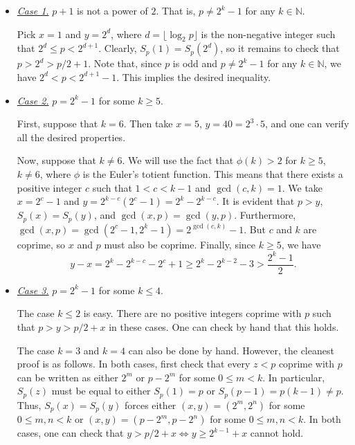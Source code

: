 \documentclass{article}
\newcommand{\N}{\mathbb{N}}
\begin{document}
\begin{itemize}

    \item
    \textit{\underline{Case 1.}}
    $p + 1$ is not a power of $2$.
    That is, $p \neq 2^k - 1$ for any $k \in \N$.

    Pick $x = 1$ and $y = 2^d$, where $d = \lfloor \log_2 p \rfloor$ is the non-negative integer such that $2^d \leq p < 2^{d + 1}$.
    Clearly, $S_p(1) = S_p(2^d)$, so it remains to check that $p > 2^d > p/2 + 1$.
    Note that, since $p$ is odd and $p \neq 2^k - 1$ for any $k \in \N$, we have $2^d < p < 2^{d + 1} - 1$.
    This implies the desired inequality.

    \item
    \textit{\underline{Case 2.}}
    $p = 2^k - 1$ for some $k \geq 5$.

    First, suppose that $k = 6$.
    Then take $x = 5$, $y = 40 = 2^3 \cdot 5$, and one can verify all the desired properties.

    Now, suppose that $k \neq 6$.
    We will use the fact that $\phi(k) > 2$ for $k \geq 5$, $k \neq 6$, where $\phi$ is the Euler's totient function.
    This means that there exists a positive integer $c$ such that $1 < c < k - 1$ and $\gcd(c, k) = 1$.
    We take $x = 2^c - 1$ and $y = 2^{k - c} (2^c - 1) = 2^k - 2^{k - c}$.
    It is evident that $p > y$, $S_p(x) = S_p(y)$, and $\gcd(x, p) = \gcd(y, p)$.
    Furthermore, $\gcd(x, p) = \gcd(2^c - 1, 2^k - 1) = 2^{\gcd(c, k)} - 1$.
    But $c$ and $k$ are coprime, so $x$ and $p$ must also be coprime.
    Finally, since $k \geq 5$, we have
    \[ y - x = 2^k - 2^{k - c} - 2^c + 1 \geq 2^k - 2^{k - 2} - 3 > \frac{2^k - 1}{2}. \]

    \item
    \textit{\underline{Case 3.}}
    $p = 2^k - 1$ for some $k \leq 4$.

    The case $k \leq 2$ is easy.
    There are no positive integers coprime with $p$ such that $p > y > p/2 + x$ in these cases.
    One can check by hand that this holds.

    The case $k = 3$ and $k = 4$ can also be done by hand.
    However, the cleanest proof is as follows.
    In both cases, first check that every $z < p$ coprime with $p$ can be written as either $2^m$ or $p - 2^m$ for some $0 \leq m < k$.
    In particular, $S_p(z)$ must be equal to either $S_p(1) = p$ or $S_p(p - 1) = p(k - 1) \neq p$.
    Thus, $S_p(x) = S_p(y)$ forces either $(x, y) = (2^m, 2^n)$ for some $0 \leq m, n < k$ or $(x, y) = (p - 2^m, p - 2^n)$ for some $0 \leq m, n < k$.
    In both cases, one can check that $y > p/2 + x \iff y \geq 2^{k - 1} + x$ cannot hold.

\end{itemize}
\end{document}
